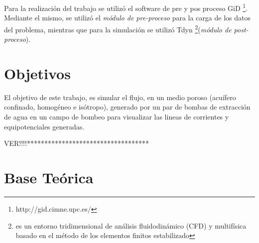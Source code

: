 \documentclass[10pt,a4paper,final]{article}
\begin{document}
Para la realización del trabajo se utilizó el software de pre y pos proceso GiD \footnote{http://gid.cimne.upc.es/}. Mediante el mismo, se utilizó el \emph{módulo de pre-proceso} para la carga de los datos del problema, mientras que para la simulación se utilizó Tdyn \footnote{es un entorno tridimensional de análisis fluidodinámico (CFD) y multifísica basado en el método de los elementos finitos estabilizado}(\emph{módulo de post-proceso}).
\section{Objetivos}
El objetivo de este trabajo, es simular el flujo, en un medio poroso (acuífero confinado, homogéneo e isótropo), generado por un par de bombas de extracción de agua en un campo de bombeo para visualizar las lineas de corrientes y equipotenciales generadas. \begin{Large}
VER!!!!***********************************
\end{Large}
\section{Base Teórica}
\end{document}

